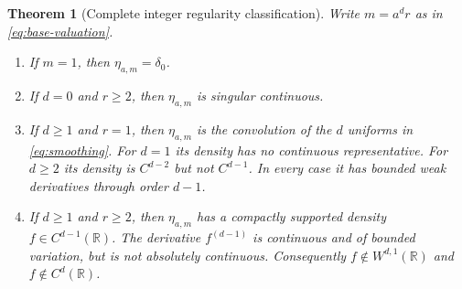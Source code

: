 \documentclass[11pt,a4paper]{article}
\newtheorem{theorem}{Theorem}[section]
\theoremstyle{definition}
\theoremstyle{remark}
\newcommand{\R}{\mathbb R}
\begin{document}
\begin{theorem}[Complete integer regularity classification]
\label{thm:regularity}
Write $m=a^dr$ as in \eqref{eq:base-valuation}.
\begin{enumerate}[label=(\roman*)]
\item If $m=1$, then $\eta_{a,m}=\delta_0$.
\item If $d=0$ and $r\ge2$, then $\eta_{a,m}$ is singular continuous.
\item If $d\ge1$ and $r=1$, then $\eta_{a,m}$ is the convolution of the
$d$ uniforms in \eqref{eq:smoothing}. For $d=1$ its density has no continuous
representative. For $d\ge2$ its density is $C^{d-2}$ but not $C^{d-1}$.
In every case it has bounded weak derivatives through order $d-1$.
\item If $d\ge1$ and $r\ge2$, then $\eta_{a,m}$ has a compactly supported
density $f\in C^{d-1}(\R)$. The derivative $f^{(d-1)}$ is continuous and
of bounded variation, but is not absolutely continuous. Consequently
$f\notin W^{d,1}(\R)$ and $f\notin C^d(\R)$.
\end{enumerate}
\end{theorem}
\end{document}
